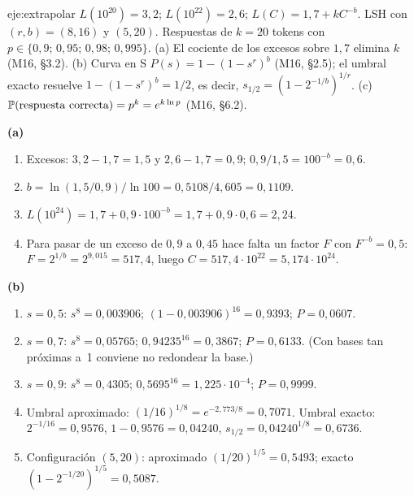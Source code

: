 \begin{solucion}{eje:extrapolar}
\datos $L(10^{20})=3{,}2$; $L(10^{22})=2{,}6$; $L(C)=1{,}7+kC^{-b}$. LSH con $(r,b)=(8,16)$ y $(5,20)$. Respuestas de $k=20$ tokens con $p\in\{0{,}9;\,0{,}95;\,0{,}98;\,0{,}995\}$.
\planteamiento (a) El cociente de los excesos sobre $1{,}7$ elimina $k$ (M16, §3.2). (b) Curva en S $P(s)=1-(1-s^{r})^{b}$ (M16, §2.5); el umbral exacto resuelve $1-(1-s^{r})^{b}=1/2$, es decir, $s_{1/2}=(1-2^{-1/b})^{1/r}$. (c) $\mathbb{P}(\text{respuesta correcta})=p^{k}=e^{k\ln p}$ (M16, §6.2).
\pasos

\noindent\textbf{(a)}
\begin{enumerate}[label=\arabic*.]
  \item Excesos: $3{,}2-1{,}7=1{,}5$ y $2{,}6-1{,}7=0{,}9$; $0{,}9/1{,}5=100^{-b}=0{,}6$.
  \item $b=\ln(1{,}5/0{,}9)/\ln 100=0{,}5108/4{,}605=0{,}1109$.
  \item $L(10^{24})=1{,}7+0{,}9\cdot 100^{-b}=1{,}7+0{,}9\cdot 0{,}6=2{,}24$.
  \item Para pasar de un exceso de $0{,}9$ a $0{,}45$ hace falta un factor $F$ con $F^{-b}=0{,}5$: $F=2^{1/b}=2^{9{,}015}=517{,}4$, luego $C=517{,}4\cdot 10^{22}=5{,}174\cdot 10^{24}$.
\end{enumerate}

\noindent\textbf{(b)}
\begin{enumerate}[label=\arabic*.]
  \item $s=0{,}5$: $s^{8}=0{,}003906$; $(1-0{,}003906)^{16}=0{,}9393$; $P=0{,}0607$.
  \item $s=0{,}7$: $s^{8}=0{,}05765$; $0{,}94235^{16}=0{,}3867$; $P=0{,}6133$. (Con bases tan próximas a~1 conviene no redondear la base.)
  \item $s=0{,}9$: $s^{8}=0{,}4305$; $0{,}5695^{16}=1{,}225\cdot 10^{-4}$; $P=0{,}9999$.
  \item Umbral aproximado: $(1/16)^{1/8}=e^{-2{,}773/8}=0{,}7071$. Umbral exacto: $2^{-1/16}=0{,}9576$, $1-0{,}9576=0{,}04240$, $s_{1/2}=0{,}04240^{1/8}=0{,}6736$.
  \item Configuración $(5,20)$: aproximado $(1/20)^{1/5}=0{,}5493$; exacto $(1-2^{-1/20})^{1/5}=0{,}5087$.
\end{enumerate}


\end{solucion}
